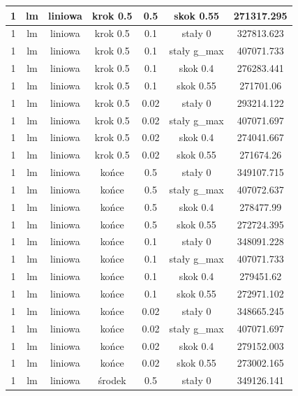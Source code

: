 \documentclass[11pt]{article}
\begin{document}
\begin{table}[h]
\begin{center}
\begin{tabular}{|c|c|c|c|c|c|c|}
      \hline
      1 & lm & liniowa & krok 0.5 & 0.5 & skok 0.55 & 271317.295 \\
      \hline
      1 & lm & liniowa & krok 0.5 & 0.1 & stały 0 & 327813.623 \\
      \hline
      1 & lm & liniowa & krok 0.5 & 0.1 & stały g_max & 407071.733 \\
      \hline
      1 & lm & liniowa & krok 0.5 & 0.1 & skok 0.4 & 276283.441 \\
      \hline
      1 & lm & liniowa & krok 0.5 & 0.1 & skok 0.55 & 271701.06 \\
      \hline
      1 & lm & liniowa & krok 0.5 & 0.02 & stały 0 & 293214.122 \\
      \hline
      1 & lm & liniowa & krok 0.5 & 0.02 & stały g_max & 407071.697 \\
      \hline
      1 & lm & liniowa & krok 0.5 & 0.02 & skok 0.4 & 274041.667 \\
      \hline
      1 & lm & liniowa & krok 0.5 & 0.02 & skok 0.55 & 271674.26 \\
      \hline
      1 & lm & liniowa & końce & 0.5 & stały 0 & 349107.715 \\
      \hline
      1 & lm & liniowa & końce & 0.5 & stały g_max & 407072.637 \\
      \hline
      1 & lm & liniowa & końce & 0.5 & skok 0.4 & 278477.99 \\
      \hline
      1 & lm & liniowa & końce & 0.5 & skok 0.55 & 272724.395 \\
      \hline
      1 & lm & liniowa & końce & 0.1 & stały 0 & 348091.228 \\
      \hline
      1 & lm & liniowa & końce & 0.1 & stały g_max & 407071.733 \\
      \hline
      1 & lm & liniowa & końce & 0.1 & skok 0.4 & 279451.62 \\
      \hline
      1 & lm & liniowa & końce & 0.1 & skok 0.55 & 272971.102 \\
      \hline
      1 & lm & liniowa & końce & 0.02 & stały 0 & 348665.245 \\
      \hline
      1 & lm & liniowa & końce & 0.02 & stały g_max & 407071.697 \\
      \hline
      1 & lm & liniowa & końce & 0.02 & skok 0.4 & 279152.003 \\
      \hline
      1 & lm & liniowa & końce & 0.02 & skok 0.55 & 273002.165 \\
      \hline
      1 & lm & liniowa & środek & 0.5 & stały 0 & 349126.141 \\

\end{tabular}
\end{center}
\end{table}
\end{document}
